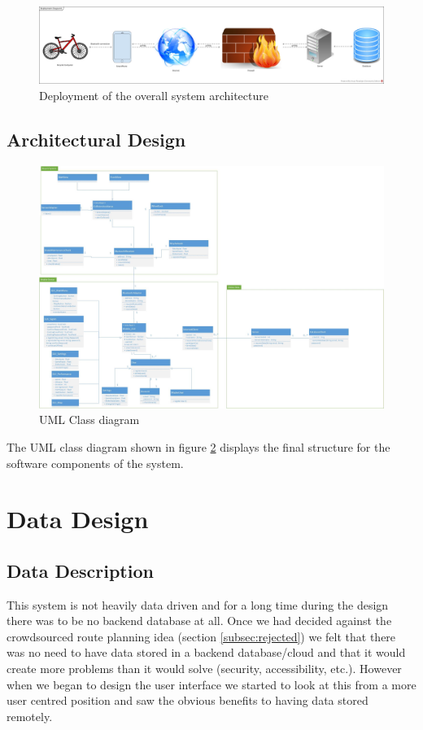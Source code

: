\documentclass[a4paper]{report}
\begin{document}
\begin{figure}[h]
\centering
\includegraphics[scale=0.2]{figures/system_architecture/overall_sys_arch}
\caption{Deployment of the overall system architecture}
\label{fig:overall_sys_arch}
\end{figure}

\section{Architectural Design}

\begin{figure}[h]
\centering
\includegraphics[scale=0.4, angle=90]{figures/system_architecture/UML_Class_Diagram}
\caption{UML Class diagram}
\label{fig:UML_Class_Diagram}
\end{figure}

The UML class diagram shown in figure \ref{fig:UML_Class_Diagram} displays the final structure for the software components of the system. 
\chapter{Data Design}
\section{Data Description}
This system is not heavily data driven and for a long time during the design there was to be no backend database at all. Once we had decided against the crowdsourced route planning idea (section \ref{subsec:rejected}) we felt that there was no need to have data stored in a backend database/cloud and that it would create more problems than it would solve (security, accessibility, etc.). However when we began to design the user interface we started to look at this from a more user centred position and saw the obvious benefits to having data stored remotely.
\end{document}
